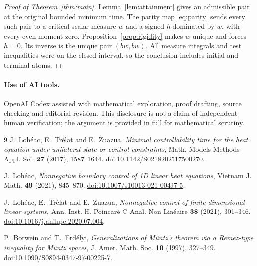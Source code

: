 \documentclass[11pt]{article}
\theoremstyle{remark}
\begin{document}
\begin{proof}[Proof of Theorem~\ref{thm:main}]
Lemma~\ref{lem:attainment} gives an admissible pair at the original bounded
minimum time. The parity map \eqref{eq:parity} sends every such pair to a
critical scalar measure $w$ and a signed $h$ dominated by $w$, with every
even moment zero. Proposition~\ref{prop:rigidity} makes $w$ unique and
forces $h=0$. Its inverse is the unique pair $(bw,bw)$. All measure
integrals and test inequalities were on the closed interval, so the conclusion
includes initial and terminal atoms.
\end{proof}

\paragraph{Use of AI tools.}
OpenAI Codex assisted with mathematical exploration, proof drafting, source
checking and editorial revision. This disclosure is not a claim of independent
human verification; the argument is provided in full for mathematical scrutiny.

\begin{thebibliography}{9}
J.~Loh\'eac, E.~Tr\'elat and E.~Zuazua,
\emph{Minimal controllability time for the heat equation under unilateral
state or control constraints},
Math. Models Methods Appl. Sci. \textbf{27} (2017), 1587--1644.
\href{https://doi.org/10.1142/S0218202517500270}{doi:10.1142/S0218202517500270}.

J.~Loh\'eac,
\emph{Nonnegative boundary control of 1D linear heat equations},
Vietnam J. Math. \textbf{49} (2021), 845--870.
\href{https://doi.org/10.1007/s10013-021-00497-5}{doi:10.1007/s10013-021-00497-5}.

J.~Loh\'eac, E.~Tr\'elat and E.~Zuazua,
\emph{Nonnegative control of finite-dimensional linear systems},
Ann. Inst. H. Poincar\'e C Anal. Non Lin\'eaire \textbf{38} (2021), 301--346.
\href{https://doi.org/10.1016/j.anihpc.2020.07.004}{doi:10.1016/j.anihpc.2020.07.004}.

P.~Borwein and T.~Erd\'elyi,
\emph{Generalizations of M\"untz's theorem via a Remez-type inequality for
M\"untz spaces},
J. Amer. Math. Soc. \textbf{10} (1997), 327--349.
\href{https://doi.org/10.1090/S0894-0347-97-00225-7}{doi:10.1090/S0894-0347-97-00225-7}.
\end{thebibliography}
\end{document}
